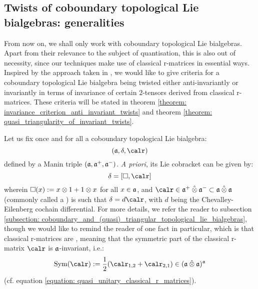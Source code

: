     \subsection{Twists of coboundary topological Lie bialgebras: generalities} \label{subsection: twisted_coboundary_topological_lie_bialgebras_generalities}
        From now on, we shall only work with coboundary topological Lie bialgebras. Apart from their relevance to the subject of quantisation, this is also out of necessity, since our techniques make use of classical r-matrices in essential ways. Inspired by the approach taken in \cite{schrader_integrable_systems_from_classical_reflection_equations}, we would like to give criteria for a coboundary topological Lie bialgebra being twisted either anti-invariantly or invariantly in terms of invariance of certain $2$-tensors derived from classical r-matrices. These criteria will be stated in theorem \ref{theorem: invariance_criterion_anti_invariant_twists} and theorem \ref{theorem: quasi_triangularity_of_invariant_twists}.

        Let us fix once and for all a coboundary topological Lie bialgebra:
            $$(\a, \delta, \calr)$$
        defined by a Manin triple $(\mathfrak{a}, \mathfrak{a}^+, \mathfrak{a}^-)$. \textit{A priori}, its Lie cobracket can be given by:
            $$\delta = [ \Box, \calr ]$$
        wherein $\Box(x) := x \tensor 1 + 1 \tensor x$ for all $x \in \mathfrak{a}$, and $\calr \in \a^+ \hattensor \a^- \subset \a \hattensor \a$ (commonly called a ) is such that $\delta = d\calr$, with $d$ being the Chevalley-Eilenberg cochain differential. For more details, we refer the reader to subsection \ref{subsection: coboundary_and_(quasi)_triangular_topological_lie_bialgebras}, though we would like to remind the reader of one fact in particular, which is that classical r-matrices are , meaning that the symmetric part of the classical r-matrix $\calr$ is $\mathfrak{a}$-invariant, i.e.:
            $$\Sym(\calr) := \frac12( \calr_{1, 2} + \calr_{2, 1} ) \in (\a \hattensor \a)^{\a}$$
        (cf. equation \eqref{equation: quasi_unitary_classical_r_matrices}).
        
